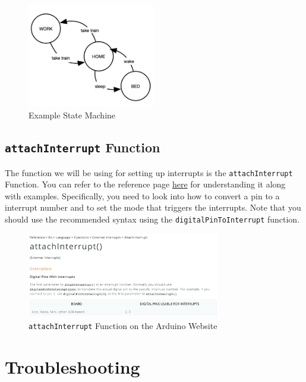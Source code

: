 \documentclass{article}
\begin{document}
        
        \begin{figure}[ht]
            \centering
            \includegraphics[width = 0.5\textwidth]{images/StateMachine.png}
            \caption{Example State Machine}
        \end{figure}
        
    \subsection{\texttt{attachInterrupt} Function} \label{attachinterrupt}
        The function we will be using for setting up interrupts is the \texttt{attachInterrupt} Function. You can refer to the reference page \href{https://www.arduino.cc/reference/en/language/functions/external-interrupts/attachinterrupt}{here} for understanding it along with examples. Specifically, you need to look into how to convert a pin to a interrupt number and to set the mode that triggers the interrupts. Note that you should use the recommended syntax using the \texttt{digitalPinToInterrupt} function.
        
        \begin{figure}[ht]
            \centering
            \includegraphics[width = 0.75\textwidth]{images/AttachInterrupt.png}
            \caption{\texttt{attachInterrupt} Function on the Arduino Website}
        \end{figure}
        

\section{Troubleshooting}
\end{document}
